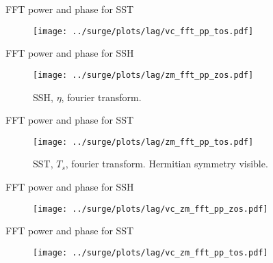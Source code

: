 \begin{frame}{FFT power and phase for SST}
\vspace{-20pt}
\begin{figure}
\texttt{[image: ../surge/plots/lag/vc\_fft\_pp\_tos.pdf]}
\caption{}
\end{figure}
\end{frame}


\begin{frame}{FFT power and phase for SSH}
\vspace{-20pt}
\begin{figure}
\texttt{[image: ../surge/plots/lag/zm\_fft\_pp\_zos.pdf]}
\caption{SSH, $\eta$, fourier transform.}
\end{figure}
\end{frame}


\begin{frame}{FFT power and phase for SST}
\vspace{-20pt}
\begin{figure}
\texttt{[image: ../surge/plots/lag/zm\_fft\_pp\_tos.pdf]}
\caption{SST, $T_s$, fourier transform. Hermitian symmetry visible.}
\end{figure}
\end{frame}


\begin{frame}{FFT power and phase for SSH}
\vspace{-20pt}
\begin{figure}
\texttt{[image: ../surge/plots/lag/vc\_zm\_fft\_pp\_zos.pdf]}
\caption{}
\end{figure}
\end{frame}

\begin{frame}{FFT power and phase for SST}
\vspace{-20pt}
\begin{figure}
\texttt{[image: ../surge/plots/lag/vc\_zm\_fft\_pp\_tos.pdf]}
\caption{}
\end{figure}
\end{frame}
